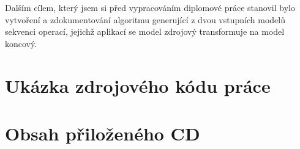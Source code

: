 \documentclass[11pt,twoside,a4paper]{book}
\begin{document}
Dalším cílem, který jsem si před vypracováním diplomové práce stanovil bylo
vytvoření a zdokumentování algoritmu generující z dvou vstupních modelů
sekvenci operací, jejichž aplikací se model zdrojový transformuje na model
koncový.


\chapter{Ukázka zdrojového kódu práce}




\chapter{Obsah přiloženého CD}

\end{document}
